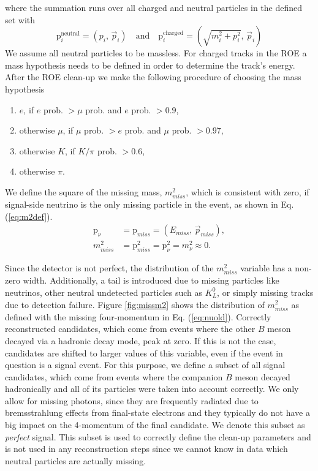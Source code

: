 where the summation runs over all charged and neutral particles in the defined set with
\begin{equation}
\mathrm{p}^{\mathrm{neutral}}_i = \left(p_i,\, \vec{p}_i \right) \quad \mathrm{and} \quad \mathrm{p}^{\mathrm{charged}}_i = \left(\sqrt{m_i^2 + p_i^2},\, \vec{p}_i \right)
\label{eq:pcharged}
\end{equation}
We assume all neutral particles to be massless. For charged tracks in the ROE a mass hypothesis needs to be defined in order to determine the track's energy. After the ROE clean-up we make the following procedure of choosing the mass hypothesis
\begin{enumerate}
	\item $e$, if $e$ prob. $> \mu$ prob. and $e$ prob. $> 0.9$,
	\item otherwise $\mu$, if $\mu$ prob. $> e$ prob. and $\mu$ prob. $> 0.97$,
	\item otherwise $K$, if $K/\pi$ prob. $> 0.6$,
	\item otherwise $\pi$.
\end{enumerate} 
We define the square of the missing mass, $m_{miss}^2$, which is consistent with zero, if signal-side neutrino is the only missing particle in the event, as shown in Eq. (\ref{eq:m2def}).
\begin{align}
\label{eq:nuold}
\mathrm{p}_\nu &= \mathrm{p}_{miss} = \left(E_{miss},\,\vec{p}_{miss} \right),\\
\label{eq:m2def}
m_{miss}^2 &= \mathrm{p}_{miss}^2 = \mathrm{p}_{\nu}^2 = m_\nu^2 \approx 0.
\end{align}

Since the detector is not perfect, the distribution of the $m_{miss}^2$ variable has a non-zero width. Additionally, a tail is introduced due to missing particles like neutrinos, other neutral undetected particles such as $K_L^0$, or simply missing tracks due to detection failure. Figure \ref{fig:missm2} shows the distribution of $m_{miss}^2$ as defined with the missing four-momentum in Eq. (\ref{eq:nuold}). Correctly reconstructed candidates, which come from events where the other $B$ meson decayed via a hadronic decay mode, peak at zero. If this is not the case, candidates are shifted to larger values of this variable, even if the event in question is a signal event. For this purpose, we define a subset of all signal candidates, which come from events where the companion $B$ meson decayed hadronically and all of its particles were taken into account correctly. We only allow for missing photons, since they are frequently radiated due to bremsstrahlung effects from final-state electrons and they typically do not have a big impact on the 4-momentum of the final candidate. We denote this subset as \textit{perfect} signal. This subset is used to correctly define the clean-up parameters and is not used in any reconstruction steps since we cannot know in data which neutral particles are actually missing.

